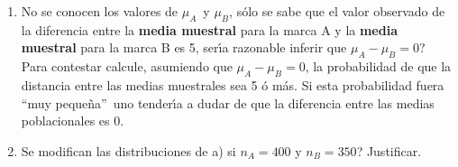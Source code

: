 \documentclass[11pt,a4paper,twoside]{article}%
\begin{document}
\begin{enumerate}
\begin{enumerate}
\item No se conocen los valores de $\mu_{A}$\ y $\mu_{B}$, s\'{o}lo se sabe
que el valor observado de la diferencia entre la \textbf{media muestral} para
la marca A y la \textbf{media muestral} para la marca B es 5,
\textquestiondown ser\'{\i}a razonable inferir que $\mu_{A}-\mu_{B}=0$? Para
contestar calcule, asumiendo que $\mu_{A}-\mu_{B}=0$, la probabilidad de que
la distancia entre las medias muestrales sea 5 \'{o} m\'{a}s. Si esta
probabilidad fuera \textquotedblleft muy peque\~{n}a\textquotedblright\ uno
tender\'{\i}a a dudar de que la diferencia entre las medias poblacionales es 0.

\item \textquestiondown Se modifican las distribuciones de a) si $n_{A}=400$ y
$n_{B}=350$? Justificar.
\end{enumerate}
\end{enumerate}
\end{document}
